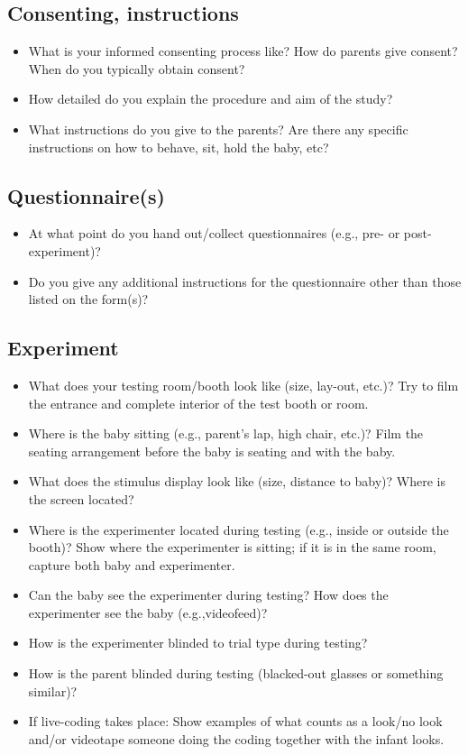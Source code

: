 \documentclass[
  letterpaper,
  DIV=11,
  numbers=noendperiod,
  oneside]{scrreprt}
\providecommand{\tightlist}{%
  \setlength{\itemsep}{0pt}\setlength{\parskip}{0pt}}
\begin{document}
\subsection{Consenting, instructions}\label{consenting-instructions}

\begin{itemize}
\tightlist
\item
  What is your informed consenting process like? How do parents give
  consent? When do you typically obtain consent?
\item
  How detailed do you explain the procedure and aim of the study?
\item
  What instructions do you give to the parents? Are there any specific
  instructions on how to behave, sit, hold the baby, etc?
\end{itemize}

\subsection{Questionnaire(s)}\label{questionnaires}

\begin{itemize}
\tightlist
\item
  At what point do you hand out/collect questionnaires (e.g., pre- or
  post-experiment)?
\item
  Do you give any additional instructions for the questionnaire other
  than those listed on the form(s)?
\end{itemize}

\subsection{Experiment}\label{experiment}

\begin{itemize}
\tightlist
\item
  What does your testing room/booth look like (size, lay-out, etc.)? Try
  to film the entrance and complete interior of the test booth or room.
\item
  Where is the baby sitting (e.g., parent's lap, high chair, etc.)? Film
  the seating arrangement before the baby is seating and with the baby.
\item
  What does the stimulus display look like (size, distance to baby)?
  Where is the screen located?
\item
  Where is the experimenter located during testing (e.g., inside or
  outside the booth)? Show where the experimenter is sitting; if it is
  in the same room, capture both baby and experimenter.
\item
  Can the baby see the experimenter during testing? How does the
  experimenter see the baby (e.g.,videofeed)?
\item
  How is the experimenter blinded to trial type during testing?
\item
  How is the parent blinded during testing (blacked-out glasses or
  something similar)?
\item
  If live-coding takes place: Show examples of what counts as a look/no
  look and/or videotape someone doing the coding together with the
  infant looks.
\end{itemize}
\end{document}
